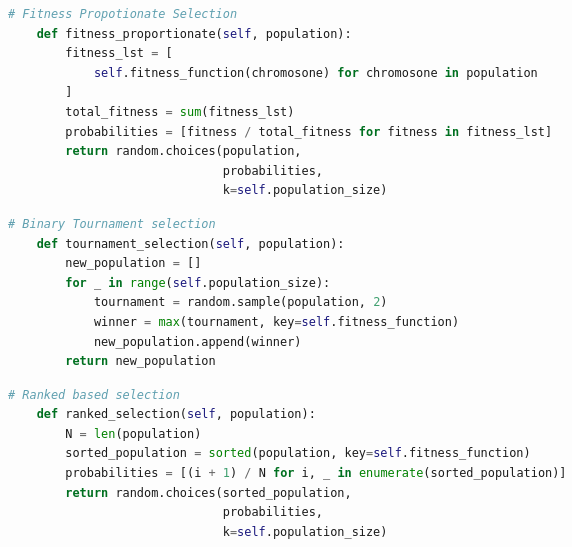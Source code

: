 \documentclass[12pt]{report} %
\begin{document}
\vspace{1cm}

\begin{changemargin}{-3cm}{-2cm}

	\begin{lstlisting}[language=python, caption= {Each chromosome will be assigned a probability of being selected. Such that the probability of a chromosome being selected is (fitness of chromosone) divided by (sum of all fitnesses).}, captionpos=b]
    # Fitness Propotionate Selection
    def fitness_proportionate(self, population):
        fitness_lst = [
            self.fitness_function(chromosone) for chromosone in population
        ]
        total_fitness = sum(fitness_lst)
        probabilities = [fitness / total_fitness for fitness in fitness_lst]
        return random.choices(population,
                              probabilities,
                              k=self.population_size)
\end{lstlisting}
\end{changemargin}



\vspace{1cm}

\begin{changemargin}{-3cm}{-2cm}

	\begin{lstlisting}[language=python, caption= {We will select two random chromosomes from the population and select the chromosome with the highest fitness and  add that chromosone to the new population.}, captionpos=b]
    # Binary Tournament selection
    def tournament_selection(self, population):
        new_population = []
        for _ in range(self.population_size):
            tournament = random.sample(population, 2)
            winner = max(tournament, key=self.fitness_function)
            new_population.append(winner)
        return new_population
\end{lstlisting}
\end{changemargin}



\vspace{1cm}

\begin{changemargin}{-3cm}{-2cm}

	\begin{lstlisting}[language=python, caption= {        The population will be sorted according to the fitness of each chromosome. The probability of a chromosome being selected is  (rank of chromosome) divided by (total number of chromosomes). The fittest invidual will have the highest rank which will be N. The least fit will have the lowest rank which will be 1.}, captionpos=b]
    # Ranked based selection
    def ranked_selection(self, population):
        N = len(population)
        sorted_population = sorted(population, key=self.fitness_function)
        probabilities = [(i + 1) / N for i, _ in enumerate(sorted_population)]
        return random.choices(sorted_population,
                              probabilities,
                              k=self.population_size)
\end{lstlisting}
\end{changemargin}
\end{document}
